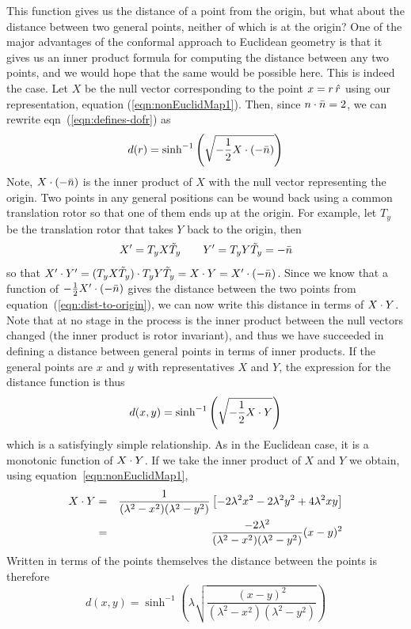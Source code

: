 This function gives us the distance of a point from the
origin, but what about the distance between two general
points, neither of which is at the origin? One of the
major advantages of the conformal approach to Euclidean
geometry is that it gives us an inner product formula for
computing the distance between any two points, and we
would hope that the same would be possible here. This is
indeed the case. Let $X$ be the null vector corresponding
to the point $x=r\, \hat{r}$ using our representation,
equation (\ref{eqn:nonEuclidMap1}). Then, since $n\cdot\bar{n} =
2$, we can rewrite eqn~(\ref{eqn:defines-dofr}) as
%
\begin{equation} \label{eqn:dist-to-origin}
d(r) = \sinh^{-1}\left(\sqrt{-\frac{1}{2} X \cdot (-\bar{n}) }
\right)
\end{equation}
%
Note, $X \cdot (-\bar{n})$ is the inner product of $X$ with the
null vector representing the origin. Two points in any
general positions can be wound back using a common
translation rotor so that one of them ends up at the
origin. For example, let $T_y$ be the translation rotor
that takes $Y$ back to the origin, then
%
\[ X' = T_y X \tilde{T}_y \qquad  Y' = T_y Y \tilde{T}_y
= -\bar{n}
\]
%
so that $X'\cdot Y' = (T_y X \tilde{T}_y)\cdot T_y Y \tilde{T}_y =
X\cdot Y =  X'\cdot (-\bar{n})$. Since we know that a function of $-\frac{1}{2}
X'\cdot (-\bar{n})$ gives the distance between the two points from
equation~(\ref{eqn:dist-to-origin}), we can now write this
distance in terms of $X\cdot Y$. Note that at no stage in the
process is the inner product between the null vectors changed (the
inner product is rotor invariant), and thus we have succeeded in
defining a distance between general points in terms of inner
products. If the general points are $x$ and $y$ with
representatives $X$ and $Y$, the expression for the distance
function is thus
%
\begin{equation}\label{eqn:general-dist-formula}
d(x,y) = \sinh^{-1}\left(\sqrt{-\frac{1}{2} X \cdot Y }
\right)
\end{equation}
%
which is a satisfyingly simple relationship. As in the
Euclidean case, it is a monotonic function of $X\cdot Y$.
If we take the inner product of $X$ and $Y$ we obtain,
using equation~\ref{eqn:nonEuclidMap1},
%
\begin{eqnarray}
X\cdot Y  & = &
\frac{1}{(\lambda^2-x^2)(\lambda^2-y^2)}\left[-2\lambda^2x^2-2\lambda^2y^2+4\lambda^2xy\right] \nonumber \\
  &  =  &
  \frac{-2\lambda^2}{(\lambda^2-x^2)(\lambda^2-y^2)}(x-y)^2
  \end{eqnarray}
%
Written in terms of the points themselves the distance
between the points is therefore
%
\begin{equation}\label{eqn:general-dist-formula-points}
d(x,y) = \sinh^{-1}\left(\lambda
\sqrt{\frac{(x-y)^2}{(\lambda^2-x^2)(\lambda^2-y^2)} }
\right)
\end{equation}
%

